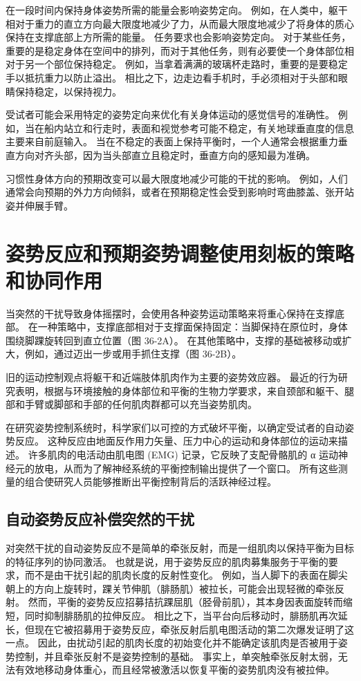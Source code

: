 在一段时间内保持身体姿势所需的能量会影响姿势定向。 例如，在人类中，躯干相对于重力的直立方向最大限度地减少了力，从而最大限度地减少了将身体的质心保持在支撑底部上方所需的能量。 任务要求也会影响姿势定向。 对于某些任务，重要的是稳定身体在空间中的排列，而对于其他任务，则有必要使一个身体部位相对于另一个部位保持稳定。 例如，当拿着满满的玻璃杯走路时，重要的是要稳定手以抵抗重力以防止溢出。 相比之下，边走边看手机时，手必须相对于头部和眼睛保持稳定，以保持视力。

受试者可能会采用特定的姿势定向来优化有关身体运动的感觉信号的准确性。 例如，当在船内站立和行走时，表面和视觉参考可能不稳定，有关地球垂直度的信息主要来自前庭输入。 当在不稳定的表面上保持平衡时，一个人通常会根据重力垂直方向对齐头部，因为当头部直立且稳定时，垂直方向的感知最为准确。

习惯性身体方向的预期改变可以最大限度地减少可能的干扰的影响。 例如，人们通常会向预期的外力方向倾斜，或者在预期稳定性会受到影响时弯曲膝盖、张开站姿并伸展手臂。


\section{姿势反应和预期姿势调整使用刻板的策略和协同作用}
当突然的干扰导致身体摇摆时，会使用各种姿势运动策略来将重心保持在支撑底部。 在一种策略中，支撑底部相对于支撑面保持固定：当脚保持在原位时，身体围绕脚踝旋转回到直立位置（图 36-2A）。 在其他策略中，支撑的基础被移动或扩大，例如，通过迈出一步或用手抓住支撑（图 36-2B）。

旧的运动控制观点将躯干和近端肢体肌肉作为主要的姿势效应器。 最近的行为研究表明，根据与环境接触的身体部位和平衡的生物力学要求，来自颈部和躯干、腿部和手臂或脚部和手部的任何肌肉群都可以充当姿势肌肉。

在研究姿势控制系统时，科学家们以可控的方式破坏平衡，以确定受试者的自动姿势反应。 这种反应由地面反作用力矢量、压力中心的运动和身体部位的运动来描述。 许多肌肉的电活动由肌电图 (EMG) 记录，它反映了支配骨骼肌的 α 运动神经元的放电，从而为了解神经系统的平衡控制输出提供了一个窗口。 所有这些测量的组合使研究人员能够推断出平衡控制背后的活跃神经过程。

\subsection{自动姿势反应补偿突然的干扰}
对突然干扰的自动姿势反应不是简单的牵张反射，而是一组肌肉以保持平衡为目标的特征序列的协同激活。 也就是说，用于姿势反应的肌肉募集服务于平衡的要求，而不是由干扰引起的肌肉长度的反射性变化。 例如，当人脚下的表面在脚尖朝上的方向上旋转时，踝关节伸肌（腓肠肌）被拉长，可能会出现轻微的牵张反射。 然而，平衡的姿势反应招募拮抗踝屈肌（胫骨前肌），其本身因表面旋转而缩短，同时抑制腓肠肌的拉伸反应。 相比之下，当平台向后移动时，腓肠肌再次延长，但现在它被招募用于姿势反应，牵张反射后肌电图活动的第二次爆发证明了这一点。 因此，由扰动引起的肌肉长度的初始变化并不能确定该肌肉是否被用于姿势控制，并且牵张反射不是姿势控制的基础。 事实上，单突触牵张反射太弱，无法有效地移动身体重心，而且经常被激活以恢复平衡的姿势肌肉没有被拉伸。

